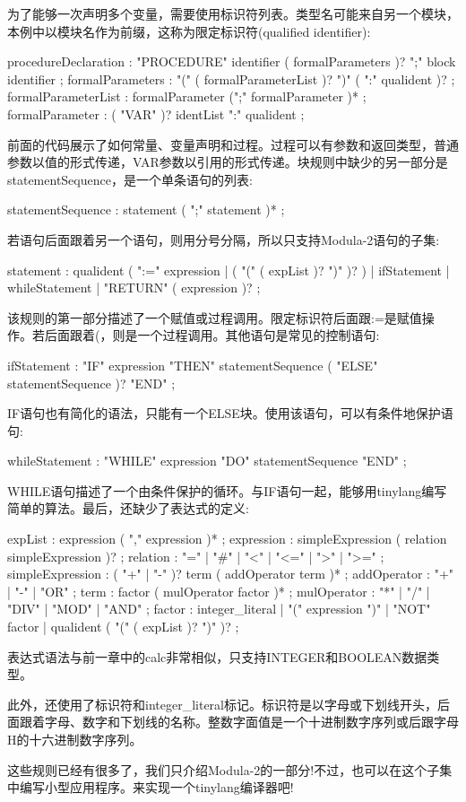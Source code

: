 为了能够一次声明多个变量，需要使用标识符列表。类型名可能来自另一个模块，本例中以模块名作为前缀，这称为限定标识符(qualified identifier):

\begin{shell}
procedureDeclaration
    : "PROCEDURE" identifier ( formalParameters )? ";"
        block identifier ;
formalParameters
    : "(" ( formalParameterList )? ")" ( ":" qualident )? ;
formalParameterList
    : formalParameter (";" formalParameter )* ;
formalParameter : ( "VAR" )? identList ":" qualident ;
\end{shell}

前面的代码展示了如何常量、变量声明和过程。过程可以有参数和返回类型，普通参数以值的形式传递，VAR参数以引用的形式传递。块规则中缺少的另一部分是statementSequence，是一个单条语句的列表:

\begin{shell}
statementSequence
    : statement ( ";" statement )* ;
\end{shell}

若语句后面跟着另一个语句，则用分号分隔，所以只支持Modula-2语句的子集:

\begin{shell}
statement
    : qualident ( ":=" expression | ( "(" ( expList )? ")" )? )
    | ifStatement | whileStatement | "RETURN" ( expression )? ;
\end{shell}

该规则的第一部分描述了一个赋值或过程调用。限定标识符后面跟:=是赋值操作。若后面跟着(，则是一个过程调用。其他语句是常见的控制语句:

\begin{shell}
ifStatement
    : "IF" expression "THEN" statementSequence
        ( "ELSE" statementSequence )? "END" ;
\end{shell}

IF语句也有简化的语法，只能有一个ELSE块。使用该语句，可以有条件地保护语句:

\begin{shell}
whileStatement
    : "WHILE" expression "DO" statementSequence "END" ;
\end{shell}

WHILE语句描述了一个由条件保护的循环。与IF语句一起，能够用tinylang编写简单的算法。最后，还缺少了表达式的定义:

\begin{shell}
expList
    : expression ( "," expression )* ;
expression
    : simpleExpression ( relation simpleExpression )? ;
relation
    : "=" | "#" | "<" | "<=" | ">" | ">=" ;
simpleExpression
    : ( "+" | "-" )? term ( addOperator term )* ;
addOperator
    : "+" | "-" | "OR" ;
term
    : factor ( mulOperator factor )* ;
mulOperator
    : "*" | "/" | "DIV" | "MOD" | "AND" ;
factor
    : integer_literal | "(" expression ")" | "NOT" factor
    | qualident ( "(" ( expList )? ")" )? ;
\end{shell}

表达式语法与前一章中的calc非常相似，只支持INTEGER和BOOLEAN数据类型。

此外，还使用了标识符和integer\_literal标记。标识符是以字母或下划线开头，后面跟着字母、数字和下划线的名称。整数字面值是一个十进制数字序列或后跟字母H的十六进制数字序列。

这些规则已经有很多了，我们只介绍Modula-2的一部分!不过，也可以在这个子集中编写小型应用程序。来实现一个tinylang编译器吧!
